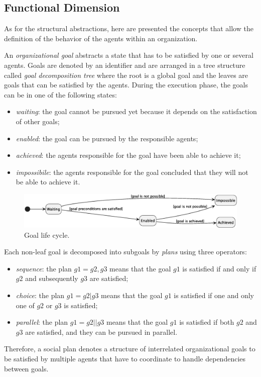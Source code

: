 \subsection{Functional Dimension}
As for the structural abstractions, here are presented the concepts that allow the definition of the behavior of the agents within an organization.

An \textit{organizational goal} abstracts a state that has to be satisfied by one or several agents.
Goals are denoted by an identifier and are arranged in a tree structure called \textit{goal decomposition tree} where the root is a global goal and the leaves are goals that can be satisfied by the agents.
During the execution phase, the goals can be in one of the following states:
\begin{itemize}
    \item \textit{waiting}: the goal cannot be pursued yet because it depends on the satisfaction of other goals;
    \item \textit{enabled}: the goal can be pursued by the responsible agents;
    \item \textit{achieved}: the agents responsible for the goal have been able to achieve it;
    \item \textit{impossibile}: the agents responsible for the goal concluded that they will not be able to achieve it.
\end{itemize}

\begin{figure}
    \centering
    \includegraphics[width=\textwidth]{images/goal-life-cycle.eps}
    \caption{Goal life cycle.}
    \label{fig:goal-life-cycle}
\end{figure}

Each non-leaf goal is decomposed into subgoals by \textit{plans} using three operators:
\begin{itemize}
    \item \textit{sequence}: the plan $g1 = g2, g3$ means that the goal $g1$ is satisfied if and only if $g2$ and subsequently $g3$ are satisfied;
    \item \textit{choice}: the plan $g1 = g2 | g3$ means that the goal $g1$ is satisfied if one and only one of $g2$ or $g3$ is satisfied;
    \item \textit{parallel}: the plan $g1 = g2 || g3$ means that the goal $g1$ is satisfied if both $g2$ and $g3$ are satisfied, and they can be pursued in parallel.
\end{itemize}
Therefore, a social plan denotes a structure of interrelated organizational goals to be satisfied by multiple agents that have to coordinate to handle dependencies between goals.


